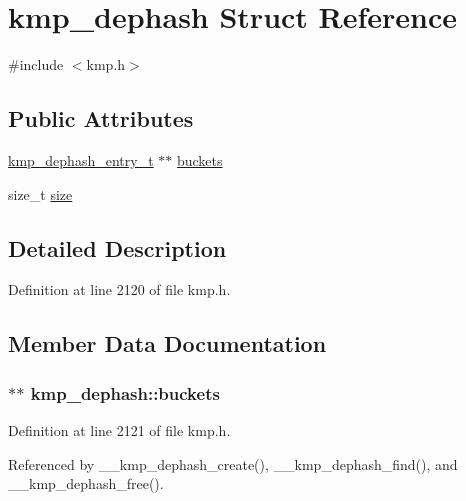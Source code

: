 \hypertarget{structkmp__dephash}{\section{kmp\-\_\-dephash Struct Reference}
\label{structkmp__dephash}
}


{\ttfamily \#include $<$kmp.\-h$>$}

\subsection*{Public Attributes}
\begin{DoxyCompactItemize}
\item 
\hyperlink{kmp_8h_ae26b65abb82278a8c3dc261171d399d5}{kmp\-\_\-dephash\-\_\-entry\-\_\-t} $\ast$$\ast$ \hyperlink{structkmp__dephash_a06e58d9ddec4328db119b478c7bff4f5}{buckets}
\item 
size\-\_\-t \hyperlink{structkmp__dephash_a6c2dd618cc89b336b65c9e8b822aac5c}{size}
\end{DoxyCompactItemize}


\subsection{Detailed Description}


Definition at line 2120 of file kmp.\-h.



\subsection{Member Data Documentation}
\hypertarget{structkmp__dephash_a06e58d9ddec4328db119b478c7bff4f5}{
\subsubsection[{buckets}]{$\ast$$\ast$ kmp\-\_\-dephash\-::buckets}}\label{structkmp__dephash_a06e58d9ddec4328db119b478c7bff4f5}


Definition at line 2121 of file kmp.\-h.



Referenced by \-\_\-\-\_\-kmp\-\_\-dephash\-\_\-create(), \-\_\-\-\_\-kmp\-\_\-dephash\-\_\-find(), and \-\_\-\-\_\-kmp\-\_\-dephash\-\_\-free().

